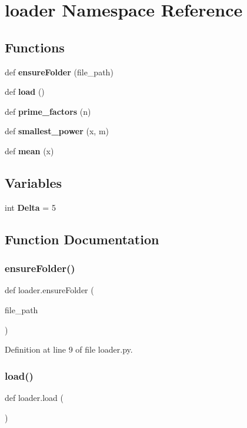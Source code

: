 \section{loader Namespace Reference}
\label{namespaceloader}
\subsection*{Functions}
\begin{DoxyCompactItemize}
\item 
def \textbf{ ensure\+Folder} (file\+\_\+path)
\item 
def \textbf{ load} ()
\item 
def \textbf{ prime\+\_\+factors} (n)
\item 
def \textbf{ smallest\+\_\+power} (x, m)
\item 
def \textbf{ mean} (x)
\end{DoxyCompactItemize}
\subsection*{Variables}
\begin{DoxyCompactItemize}
\item 
int \textbf{ Delta} = 5
\end{DoxyCompactItemize}


\subsection{Function Documentation}
\mbox{\label{namespaceloader_a2a33544726508edff90e9fec9ecda720}} 
\subsubsection{ensure\+Folder()}
{\footnotesize\ttfamily def loader.\+ensure\+Folder (\begin{DoxyParamCaption}\item[{}]{file\+\_\+path }\end{DoxyParamCaption})}



Definition at line 9 of file loader.\+py.

\mbox{\label{namespaceloader_a8cbca5ca3922e9f3e97a909e1fd02552}} 
\subsubsection{load()}
{\footnotesize\ttfamily def loader.\+load (\begin{DoxyParamCaption}{ }\end{DoxyParamCaption})}



